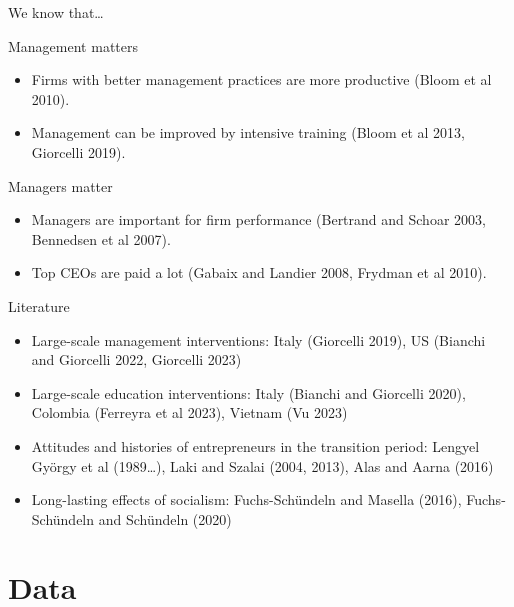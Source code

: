 \documentclass[
  ignorenonframetext,
  aspectratio=1610,
]{beamer}
\providecommand{\tightlist}{%
  \setlength{\itemsep}{0pt}\setlength{\parskip}{0pt}}
\begin{document}
\begin{frame}{We know that\ldots{}}
\protect\hypertarget{we-know-that}{}
\begin{block}{Management matters}
\protect\hypertarget{management-matters}{}
\begin{itemize}
\tightlist
\item
  Firms with better management practices are more productive (Bloom et
  al 2010).
\item
  Management can be improved by intensive training (Bloom et al 2013,
  Giorcelli 2019).
\end{itemize}
\end{block}

\begin{block}{Managers matter}
\protect\hypertarget{managers-matter}{}
\begin{itemize}
\tightlist
\item
  Managers are important for firm performance (Bertrand and Schoar 2003,
  Bennedsen et al 2007).
\item
  Top CEOs are paid a lot (Gabaix and Landier 2008, Frydman et al 2010).
\end{itemize}
\end{block}
\end{frame}

\begin{frame}{Literature}
\protect\hypertarget{literature}{}
\begin{itemize}
\tightlist
\item
  Large-scale management interventions: Italy (Giorcelli 2019), US
  (Bianchi and Giorcelli 2022, Giorcelli 2023)
\item
  Large-scale education interventions: Italy (Bianchi and Giorcelli
  2020), Colombia (Ferreyra et al 2023), Vietnam (Vu 2023)
\item
  Attitudes and histories of entrepreneurs in the transition period:
  Lengyel György et al (1989\ldots), Laki and Szalai (2004, 2013), Alas
  and Aarna (2016)
\item
  Long-lasting effects of socialism: Fuchs-Schündeln and Masella (2016),
  Fuchs-Schündeln and Schündeln (2020)
\end{itemize}
\end{frame}

\section{Data}\label{data}
\end{document}
